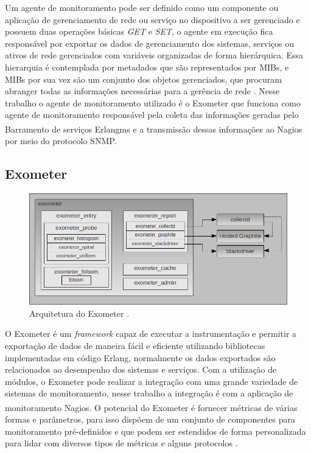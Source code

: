 Um agente de monitoramento pode ser definido como um componente ou aplicação de gerenciamento de rede ou serviço no dispositivo a ser gerenciado e possuem duas operações básicas \textit{GET} e \textit{SET}, o agente em execução fica responsável por exportar os dados de gerenciamento dos sistemas, serviços ou ativos de rede gerenciados com variáveis organizadas de forma hierárquica. Essa hierarquia é contemplada por metadados que são representados por \acrshort{MIBs}, e \acrshort{MIBs} por sua vez são um conjunto dos objetos gerenciados, que procuram abranger todas as informações necessárias para a gerência de rede \cite{6240708}. Nesse trabalho o agente de monitoramento utilizado é o Exometer que funciona como agente de monitoramento responsável pela coleta das informações geradas pelo Barramento de serviços Erlangms e a transmissão dessas informações ao Nagios\textsuperscript{\textregistered} por meio do protocolo \acrshort{SNMP}. 


\subsection{Exometer}

\begin{figure}[h!]
	\begin{center}
	\includegraphics[scale = 0.60]{img/exometer_overview.png}
		\caption{Arquitetura do Exometer \cite{exometer_core}.}
		\label{fun:fig:zabbix}
	\end{center}
\end{figure}
O Exometer é um \textit{framework} capaz de executar a instrumentação e permitir a exportação de dados de maneira fácil e eficiente utilizando bibliotecas implementadas em código Erlang, normalmente os dados exportados são relacionados ao desempenho dos sistemas e serviços. Com a utilização de módulos, o Exometer pode realizar a integração com uma grande variedade de sistemas de monitoramento, nesse trabalho a integração é com a aplicação de monitoramento Nagios\textsuperscript{\textregistered}. O potencial do Exometer é fornecer métricas de várias formas e parâmetros, para isso dispõem de um conjunto de componentes para monitoramento pré-definidos e que podem ser estendidos de forma personalizada para lidar com diversos tipos de métricas e alguns protocolos \cite{exometer_core}.




